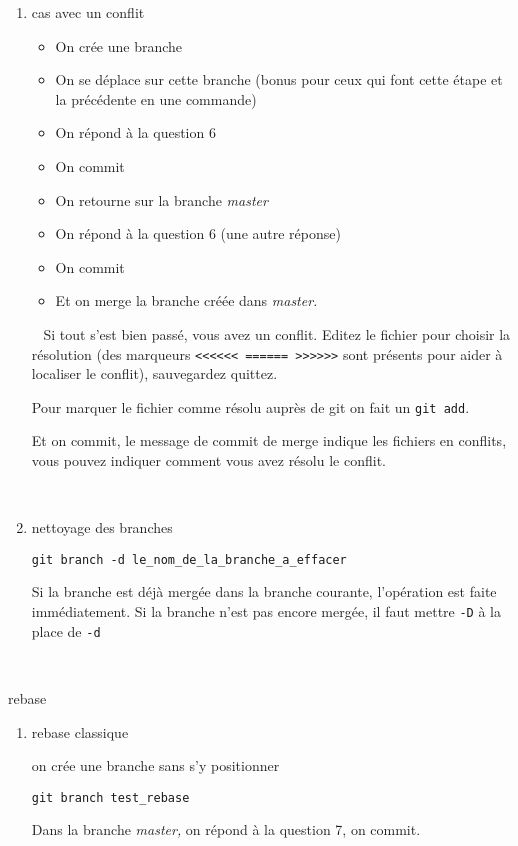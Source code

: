 \documentclass[10pt]{exam}
\begin{document}
\begin{questions}
\begin{enumerate}
~

\item cas avec un conflit

\begin{itemize}
\item On crée une branche
\item On se déplace sur cette branche (bonus pour ceux qui font cette étape et la précédente en une commande)
\item On répond à la question 6
\item On commit
\item On retourne sur la branche \emph{master}
\item On répond à la question 6 (une autre réponse)
\item On commit 
\item Et on merge la branche créée dans \emph{master.}
\end{itemize}

~
Si tout s'est bien passé, vous avez un conflit. Editez le fichier pour choisir la résolution (des marqueurs \texttt{<{}<{}<{}<{}<{}< ====== >{}>{}>{}>{}>{}>} sont présents pour aider à localiser le conflit), sauvegardez quittez.

Pour marquer le fichier comme résolu auprès de git on fait un \texttt{git add}.

Et on commit, le message de commit de merge indique les fichiers en conflits, vous pouvez indiquer comment vous avez résolu le conflit.

~

\item nettoyage des branches
\begin{lstlisting}
git branch -d le_nom_de_la_branche_a_effacer
\end{lstlisting}
Si la branche est déjà mergée dans la branche courante, l'opération est faite immédiatement. Si la branche n'est pas encore mergée, il faut mettre \texttt{-D} à la place de \texttt{-d}
\end{enumerate}

~

\question rebase

\begin{enumerate}
\item rebase classique

on crée une branche sans s'y positionner
\begin{lstlisting}
git branch test_rebase
\end{lstlisting}
Dans la branche \emph{master,} on répond à la question 7, on commit.


\end{enumerate}
\end{questions}
\end{document}
